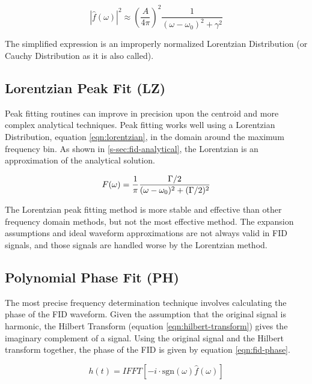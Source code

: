 \begin{equation}
\label{eqn:fid-analytical-expansion}
\left| \hat{f}(\omega) \right|^2 \approx
\left(\frac{A}{4\pi}\right)^2 
\frac{1}{(\omega - \omega_0)^2 + \gamma^2}
\end{equation}

\noindent
The simplified expression is an improperly normalized Lorentzian Distribution (or Cauchy Distribution as it is also called).

\subsection{Lorentzian Peak Fit (LZ)}

Peak fitting routines can improve in precision upon the centroid and more complex analytical techniques.  Peak fitting works well using a Lorentzian Distribution, equation \ref{eqn:lorentzian}, in the domain around the maximum frequency bin. As shown in \ref{s-sec:fid-analytical}, the Lorentzian is an approximation of the analytical solution.

\begin{equation}
\label{eqn:lorentzian}
F(\omega) = \frac{1}{\pi} \\
\frac{\Gamma / 2}{(\omega - \omega_0)^2 + (\Gamma / 2)^2}
\end{equation}

The Lorentzian peak fitting method is more stable and effective than other frequency domain methods, but not the most effective method.  The expansion assumptions and ideal waveform approximations are not always valid in FID signals, and those signals are handled worse by the Lorentzian method.

\subsection{Polynomial Phase Fit (PH)}
The most precise frequency determination technique involves calculating the phase of the FID waveform.  Given the assumption that the original signal is harmonic, the Hilbert Transform (equation \ref{eqn:hilbert-transform}) gives the imaginary complement of a signal.  Using the original signal and the Hilbert transform together, the phase of the FID is given by equation \ref{eqn:fid-phase}.

\begin{equation}
\label{eqn:hilbert-transform}
h(t) = IFFT[-i \cdot \mathrm{sgn}(\omega) \hat{f}(\omega)]
\end{equation}


